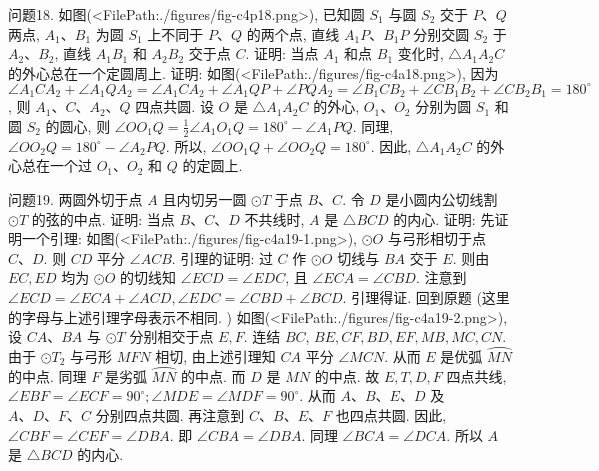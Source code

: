 问题18. 如图(<FilePath:./figures/fig-c4p18.png>), 已知圆 $S_1$ 与圆 $S_2$ 交于 $P 、 Q$ 两点, $A_1 、 B_1$ 为圆 $S_1$ 上不同于 $P 、 Q$ 的两个点, 直线 $A_1 P 、 B_1 P$ 分别交圆 $S_2$ 于 $A_2 、 B_2$, 直线 $A_1 B_1$ 和 $A_2 B_2$ 交于点 $C$. 证明: 当点 $A_1$ 和点 $B_1$ 变化时, $\triangle A_1 A_2 C$ 的外心总在一个定圆周上.
证明: 如图(<FilePath:./figures/fig-c4a18.png>), 因为 $\angle A_1 C A_2+\angle A_1 Q A_2= \angle A_1 C A_2+\angle A_1 Q P+\angle P Q A_2=\angle B_1 C B_2+\angle C B_1 B_2+ \angle C B_2 B_1=180^{\circ}$, 则 $A_1 、 C 、 A_2 、 Q$ 四点共圆.
设 $O$ 是 $\triangle A_1 A_2 C$ 的外心, $O_1 、 O_2$ 分别为圆 $S_1$ 和圆 $S_2$ 的圆心, 则 $\angle O O_1 Q=\frac{1}{2} \angle A_1 O_1 Q=180^{\circ}-\angle A_1 P Q$. 同理, $\angle O O_2 Q=180^{\circ}-\angle A_2 P Q$. 所以, $\angle O O_1 Q+\angle O O_2 Q=180^{\circ}$. 因此, $\triangle A_1 A_2 C$ 的外心总在一个过 $O_1 、 O_2$ 和 $Q$ 的定圆上.



问题19. 两圆外切于点 $A$ 且内切另一圆 $\odot T$ 于点 $B 、 C$. 令 $D$ 是小圆内公切线割 $\odot T$ 的弦的中点.
证明: 当点 $B 、 C 、 D$ 不共线时, $A$ 是 $\triangle B C D$ 的内心.
证明: 先证明一个引理: 如图(<FilePath:./figures/fig-c4a19-1.png>), $\odot O$ 与弓形相切于点 $C 、 D$. 则 $C D$ 平分 $\angle A C B$.
引理的证明: 过 $C$ 作 $\odot O$ 切线与 $B A$ 交于 $E$. 则由 $E C, E D$ 均为 $\odot O$ 的切线知 $\angle E C D=\angle E D C$, 且 $\angle E C A=\angle C B D$. 注意到 $\angle E C D= \angle E C A+\angle A C D, \angle E D C=\angle C B D+\angle B C D$. 引理得证.
回到原题 (这里的字母与上述引理字母表示不相同.
)
如图(<FilePath:./figures/fig-c4a19-2.png>), 设 $C A 、 B A$ 与 $\odot T$ 分别相交于点 $E, F$. 连结 $B C$, $B E, C F, B D, E F, M B, M C, C N$. 由于 $\odot T_2$ 与弓形 $M F N$ 相切, 由上述引理知 $C A$ 平分 $\angle M C N$. 从而 $E$ 是优弧 $\overparen{M N}$ 的中点.
同理 $F$ 是劣弧 $\overparen{M N}$ 的中点.
而 $D$ 是 $M N$ 的中点.
故 $E, T, D, F$ 四点共线, $\angle E B F= \angle E C F=90^{\circ} ; \angle M D E=\angle M D F=90^{\circ}$. 从而 $A 、 B 、 E 、 D$ 及 $A 、 D 、 F 、 C$ 分别四点共圆.
再注意到 $C 、 B 、E 、 F$ 也四点共圆.
因此, $\angle C B F=\angle C E F=\angle D B A$. 即 $\angle C B A=\angle D B A$. 同理 $\angle B C A=\angle D C A$. 所以 $A$ 是 $\triangle B C D$ 的内心.


